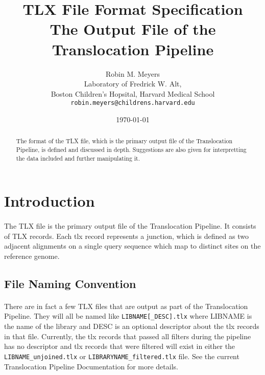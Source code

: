 \documentclass{article}
\begin{document}
\title{TLX File Format Specification \\ \large The Output File of the Translocation Pipeline}
\author{Robin M. Meyers\\
  Laboratory of Fredrick W. Alt,\\
  Boston Children's Hopsital, Harvard Medical School\\
  \texttt{robin.meyers@childrens.harvard.edu}}
\date{\today}
\maketitle

\begin{abstract}
The format of the TLX file, which is the primary output file of the Translocation Pipeline, is defined and discussed in depth. Suggestions are also given for interpretting the data included and further manipulating it. 
\end{abstract}

\section{Introduction}
\paragraph{} The TLX file is the primary output file of the Translocation Pipeline. It consists of TLX records. Each tlx record represents a junction, which is defined as two adjacent alignments on a single query sequence which map to distinct sites on the reference genome. 

\subsection*{File Naming Convention}
\paragraph{} There are in fact a few TLX files that are output as part of the Translocation Pipeline. They will all be named like \texttt{LIBNAME[\_DESC].tlx} where LIBNAME is the name of the library and DESC is an optional descriptor about the tlx records in that file. Currently, the tlx records that passed all filters during the pipeline has no descriptor and tlx records that were filtered will exist in either the \texttt{LIBNAME\_unjoined.tlx} or \texttt{LIBRARYNAME\_filtered.tlx} file. See the current Translocation Pipeline Documentation for more details.
\end{document}

